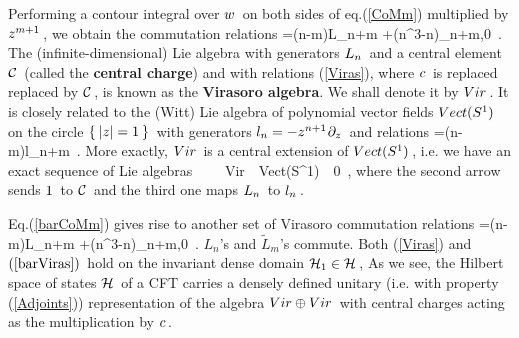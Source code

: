 Performing a contour integral over \s$w\hspace{0.05cm}$ on both sides
of eq.\s\s(\ref{CoMm}) multiplied by \s$z^{m+1}\hspace{0.05cm}$, we
obtain the commutation relations
\qq
  [L_n\m,\s L_m]\s=\s(n-m)\s L_{n+m}\s
  +\s{}\m(n^3-n)\s\delta_{n+m,0}\ .
  \label{Viras}
\qqq
The (infinite-dimensional) Lie algebra with
generators \s$L_n\hspace{0.05cm}$ and a central element
\s${\cal C}\hspace{0.05cm}$ (called the {\bf central charge})
and with relations (\ref{Viras}), where \s$c\hspace{0.05cm}$
is replaced replaced by \s${\cal C}\hspace{0.05cm}$, \s
is known as the {\bf Virasoro algebra}.
We shall denote it by \s${Vir}\hspace{0.05cm}$. \s
It is closely related to the (Witt) Lie algebra of
polynomial vector fields \s${Vect}(S^1)\hspace{0.05cm}$ on
the circle \s$\{\m\s|z|=1\s\m\}\s$
with generators \s$l_n=-z^{n+1}\hspace{0.025cm}\partial_z\hspace{0.05cm}$
and relations
\qq
[l_n\m,\s l_m]\s=\s(n-m)\s l_{n+m}\ .
\non
\qqq
More exactly, \s${Vir}\hspace{0.05cm}$ is a central extension
of \s${Vect}(S^1)\hspace{0.05cm}$, i.\s e. we
have an exact sequence of Lie algebras
\ \longrightarrow\ \NC\ \longrightarrow\ {Vir}\
\longrightarrow\
{Vect}(S^1)\ \longrightarrow\ 0\ ,
\non
\qqq
where the second arrow sends \s$1\hspace{0.05cm}$ to \s${\cal C}\hspace{0.05cm}$ and the third
one maps \s$L_n\hspace{0.05cm}$ to \s$l_n\hspace{0.05cm}$.
\vs 0.5cm

Eq.\s\s(\ref{barCoMm}) gives rise to
another set of Virasoro commutation relations
\s=\s(n-m)\s\tilde L_{n+m}\s
  +\s{}\m(n^3-n)\s\delta_{n+m,0}\ .
  \label{barViras}
\qqq
$L_n$'s and \s$\tilde L_m$'s commute. \s Both
(\ref{Viras}) and \s$(\ref{barViras})\hspace{0.05cm}$
hold on the invariant dense domain \s${\cal H}_1\in{\cal H}\hspace{0.05cm}$,
\s As we see, the Hilbert space of
states \s${\cal H}\hspace{0.05cm}$ of a CFT
carries a densely defined unitary
(i.\s e. with property (\ref{Adjoints})\m)
\m representation of the algebra
\s${Vir}\oplus{Vir}\hspace{0.05cm}$ with central charges
acting as the multiplication by \s$c\hspace{0.05cm}$.
\vs 0.5cm

